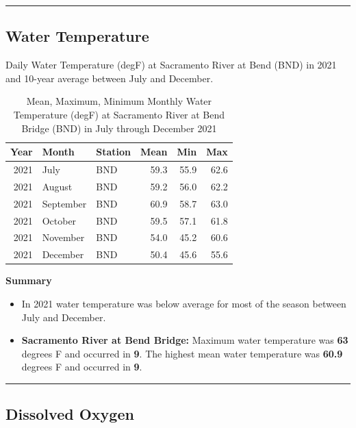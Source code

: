 \documentclass[
]{book}
\providecommand{\tightlist}{%
  \setlength{\itemsep}{0pt}\setlength{\parskip}{0pt}}
\theoremstyle{definition}
\theoremstyle{definition}
\theoremstyle{definition}
\theoremstyle{definition}
\theoremstyle{remark}
\begin{document}
\begin{center}\rule{0.5\linewidth}{0.5pt}\end{center}

\hypertarget{water-temperature-1}{%
\subsection{Water Temperature}\label{water-temperature-1}}

\label{fig:wtempBND-fig}Daily Water Temperature (degF) at Sacramento River at Bend (BND) in 2021 and 10-year average between July and December.

\begin{table}
\centering
\caption{Mean, Maximum, Minimum Monthly Water Temperature (degF) at Sacramento River at Bend Bridge (BND) in July through December 2021}
\centering
\begin{tabular}[t]{rllrrr}
\hline
Year & Month & Station & Mean & Min & Max\\
\hline
2021 & July & BND & 59.3 & 55.9 & 62.6\\
\hline
2021 & August & BND & 59.2 & 56.0 & 62.2\\
\hline
2021 & September & BND & 60.9 & 58.7 & 63.0\\
\hline
2021 & October & BND & 59.5 & 57.1 & 61.8\\
\hline
2021 & November & BND & 54.0 & 45.2 & 60.6\\
\hline
2021 & December & BND & 50.4 & 45.6 & 55.6\\
\hline
\end{tabular}
\end{table}

\textbf{Summary}

\begin{itemize}
\tightlist
\item
  In 2021 water temperature was below average for most of the season between July and December.
\item
  \textbf{Sacramento River at Bend Bridge:} Maximum water temperature was \textbf{63} degrees F and occurred in \textbf{9}. The highest mean water temperature was \textbf{60.9} degrees F and occurred in \textbf{9}.
\end{itemize}

\begin{center}\rule{0.5\linewidth}{0.5pt}\end{center}

\hypertarget{dissolved-oxygen}{%
\subsection{Dissolved Oxygen}\label{dissolved-oxygen}}
\end{document}
